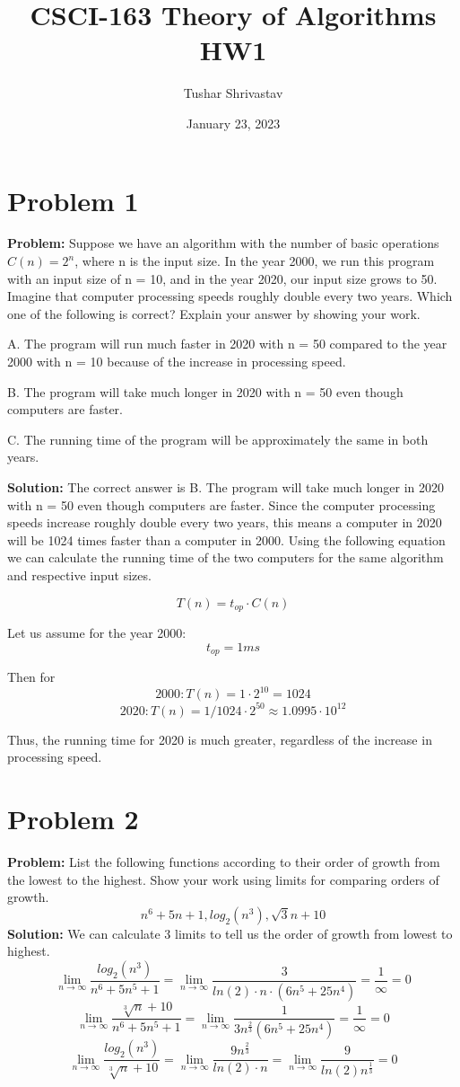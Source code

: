 \documentclass{article}
\title{CSCI-163 Theory of Algorithms HW1}
\author{Tushar Shrivastav}
\date{January 23, 2023}
\begin{document}
\maketitle

\section{Problem 1}
\textbf{Problem:} 
Suppose we have an algorithm with the number of basic operations $C(n) = 2^n$,
where n is the input size. In the year 2000, we run this program with an input size of
n = 10, and in the year 2020, our input size grows to 50. Imagine that computer processing speeds roughly double every two years. Which one of the following is correct?
Explain your answer by showing your work.

A. The program will run much faster in 2020 with n = 50 compared to the year 2000
with n = 10 because of the increase in processing speed.

B. The program will take much longer in 2020 with n = 50 even though computers
are faster.

C. The running time of the program will be approximately the same in both years.

\textbf{Solution:}
The correct answer is B. The program will take much longer in 2020 with n = 50 even though computers are faster. Since the computer processing speeds increase roughly double every two years, this means a computer in 2020 will be 1024 times faster than a computer in 2000. Using the following equation we can calculate the running time of the two computers for the same algorithm and respective input sizes.

\begin{equation}
    T(n) = t_{op} \cdot C(n)
\end{equation}

Let us assume for the year 2000: \[t_{op} = 1 ms\] 

Then for  \[2000: T(n) = 1 \cdot 2^{10} = 1024\] \[2020: T(n) = 1/1024 \cdot 2^{50} \approx 1.0995 \cdot 10^{12}\]

Thus, the running time for 2020 is much greater, regardless of the increase in processing speed.

\section{Problem 2}
\textbf{Problem:} List the following functions according to their order of growth from the lowest
to the highest. Show your work using limits for comparing orders of growth.
\[n^6 +5n +1, log_2(n^3), \sqrt{3}{n} + 10\]
\textbf{Solution: }
We can calculate 3 limits to tell us the order of growth from lowest to highest.
\[ \lim_{n\to\infty} \frac{log_2(n^3)}{n^6+5n^5+1} = \lim_{n\to\infty} \frac{3}{ln(2)\cdot n \cdot (6n^5 +25n^4)} = \frac{1}{\infty} = 0\]
\[ \lim_{n\to\infty} \frac{\sqrt[3]{n}+10}{n^6+5n^5+1} = \lim_{n\to\infty} \frac{1}{3n^{\frac{2}{3}}(6n^5 +25n^4)} = \frac{1}{\infty} = 0 \]
\[ \lim_{n\to\infty} \frac{log_2(n^3)}{\sqrt[3]{n}+10} = \lim_{n\to\infty} \frac{9n^{\frac{2}{3}} }{ln(2)\cdot n} = \lim_{n\to\infty} {\frac{9}{ln(2)n^{\frac{1}{3}}}} = 0\]
\end{document}
